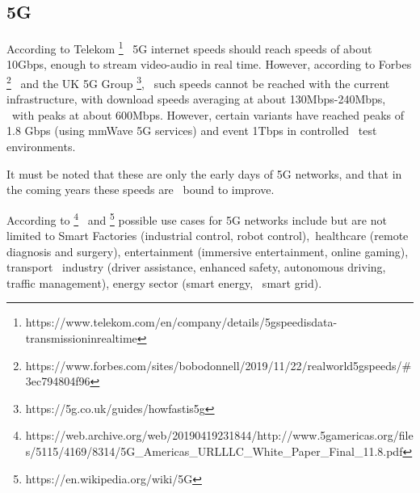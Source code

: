 
\subsection{5G}
\label{subsec:5g}
According to Telekom \footnote{https://www.telekom.com/en/company/details/5g\-speed\-is\-data-transmission\-in\-real\-time} \
5G internet speeds should reach speeds of about 10Gbps, enough to stream video-audio in real time.
However, according to Forbes \footnote{https://www.forbes.com/sites/bobodonnell/2019/11/22/real\-world\-5g\-speeds/\#3ec794804f96} \
and the UK 5G Group \footnote{https://5g.co.uk/guides/how\-fast\-is\-5g}, \
such speeds cannot be reached with the current infrastructure, with download speeds averaging at about 130Mbps-240Mbps, \
with peaks at about 600Mbps.
However, certain variants have reached peaks of 1.8 Gbps (using mmWave 5G services) and event 1Tbps in controlled \
test environments.

It must be noted that these are only the early days of 5G networks, and that in the coming years these speeds are \
bound to improve.

According to
\footnote{https://web.archive.org/web/20190419231844/http://www.5gamericas.org/files/5115/4169/8314/5G\_Americas\_URLLLC\_White\_Paper\_Final\_11.8.pdf} \
and \footnote{https://en.wikipedia.org/wiki/5G}
possible use cases for 5G networks include but are not limited to  Smart Factories (industrial control, robot control),\
 healthcare (remote diagnosis and surgery), entertainment (immersive entertainment, online gaming), transport \
industry (driver assistance, enhanced safety, autonomous driving, traffic management), energy sector (smart energy, \
smart grid).


